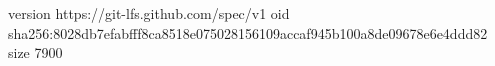 version https://git-lfs.github.com/spec/v1
oid sha256:8028db7efabfff8ca8518e075028156109accaf945b100a8de09678e6e4ddd82
size 7900
